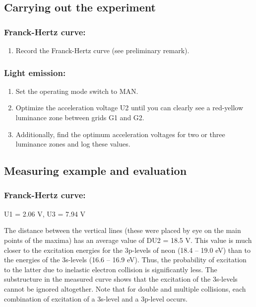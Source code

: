 \documentclass[a4paper, 10pt, nanum]{CSUniSchoolLabReport}
\begin{document}
\subsection{Carrying out the experiment}

\subsubsection{Franck-Hertz curve:}
	\begin{enumerate}[label=\arabic*.]
		\item Record the Franck-Hertz curve (see preliminary remark). 
	\end{enumerate}

\subsubsection{Light emission:}
	\begin{enumerate}[label=\arabic*.]
		\item Set the operating mode switch to MAN. 
		\item Optimize the acceleration voltage U2 until you can clearly see a red-yellow luminance zone between grids G1 and G2. 
		\item Additionally, find the optimum acceleration voltages for two or three luminance zones and log these values. 
	\end{enumerate}

\subsection{Measuring example and evaluation}

\subsubsection{Franck-Hertz curve:}
	U1 = 2.06 V, U3 = 7.94 V 

	The distance between the vertical lines (these were placed by eye on the main points of the maxima) has an average value of DU2 = 18.5 V. This value is much closer to the excitation energies for the 3p-levels of neon (18.4 – 19.0 eV) than to the energies of the 3s-levels (16.6 – 16.9 eV). Thus, the probability of excitation to the latter due to inelastic electron collision is significantly less. The substructure in the measured curve shows that the excitation of the 3s-levels cannot be ignored altogether. Note that for double and multiple collisions, each combination of excitation of a 3s-level and a 3p-level occurs. 
\end{document}
